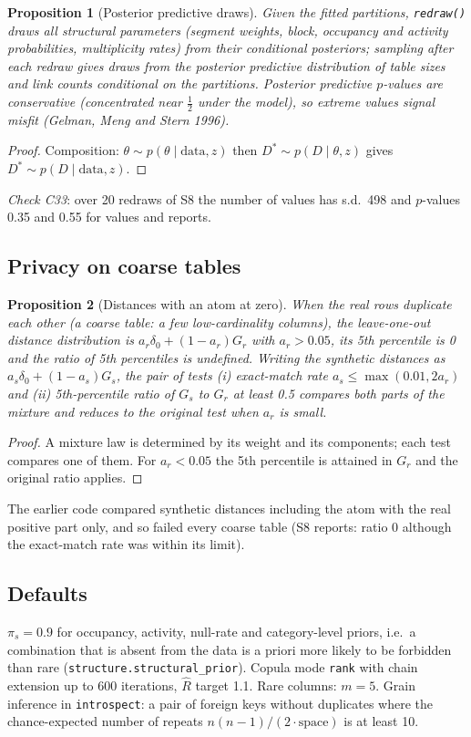 \documentclass[11pt,a4paper]{article}
\newtheorem{proposition}{Proposition}
\theoremstyle{definition}
\theoremstyle{remark}
\begin{document}
\begin{proposition}[Posterior predictive draws]\label{prop:ppc}
Given the fitted partitions, \texttt{redraw()} draws all structural parameters (segment weights, block, occupancy and activity probabilities, multiplicity rates) from their conditional posteriors; sampling after each redraw gives draws from the posterior predictive distribution of table sizes and link counts conditional on the partitions. Posterior predictive $p$-values are conservative (concentrated near $\tfrac12$ under the model), so extreme values signal misfit (Gelman, Meng and Stern 1996).
\end{proposition}
\begin{proof}
Composition: $\theta\sim p(\theta\mid\text{data},z)$ then $D^*\sim p(D\mid\theta,z)$ gives $D^*\sim p(D\mid\text{data},z)$.
\end{proof}
\noindent\emph{Check C33}: over 20 redraws of S8 the number of values has s.d.\ 498 and $p$-values 0.35 and 0.55 for values and reports.

\subsection{Privacy on coarse tables}
\begin{proposition}[Distances with an atom at zero]\label{prop:dcr}
When the real rows duplicate each other (a coarse table: a few low-cardinality columns), the leave-one-out distance distribution is $a_r\delta_0+(1-a_r)G_r$ with $a_r>0.05$, its 5th percentile is 0 and the ratio of 5th percentiles is undefined. Writing the synthetic distances as $a_s\delta_0+(1-a_s)G_s$, the pair of tests (i) exact-match rate $a_s\le\max(0.01,2a_r)$ and (ii) 5th-percentile ratio of $G_s$ to $G_r$ at least 0.5 compares both parts of the mixture and reduces to the original test when $a_r$ is small.
\end{proposition}
\begin{proof}
A mixture law is determined by its weight and its components; each test compares one of them. For $a_r<0.05$ the 5th percentile is attained in $G_r$ and the original ratio applies.
\end{proof}
\noindent The earlier code compared synthetic distances including the atom with the real positive part only, and so failed every coarse table (S8 reports: ratio 0 although the exact-match rate was within its limit).

\subsection{Defaults}
$\pi_s=0.9$ for occupancy, activity, null-rate and category-level priors, i.e.\ a combination that is absent from the data is a priori more likely to be forbidden than rare (\texttt{structure.structural\_prior}). Copula mode \texttt{rank} with chain extension up to 600 iterations, $\hat R$ target 1.1. Rare columns: $m=5$. Grain inference in \texttt{introspect}: a pair of foreign keys without duplicates where the chance-expected number of repeats $n(n-1)/(2\cdot\text{space})$ is at least 10.
\end{document}
